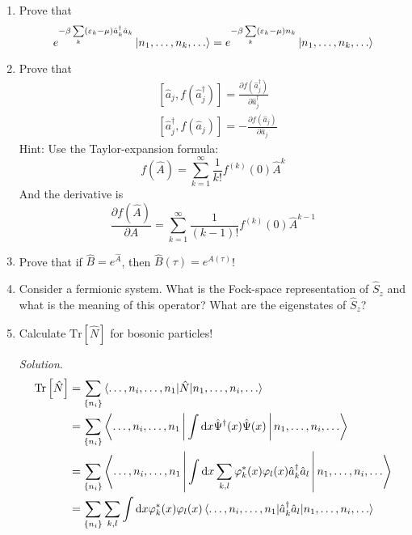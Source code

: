 \documentclass[11pt, a4paper]{article}
\newcommand{\dd}{\mathrm{d}}
\newcommand{\Tr}[1]{\mathrm{Tr}\left[#1\right]}
\begin{document}
\begin{enumerate}
    \item Prove that 
    \begin{equation*}
        e^{-\beta\sum\limits_k(\varepsilon_k - \mu)\hat a_k^{\dagger}\hat a_k}\ket{n_1, \dots, n_k, \dots}
        = e^{-\beta\sum\limits_k(\varepsilon_k - \mu)n_k}\ket{n_1, \dots, n_k, \dots}
    \end{equation*}
    \item Prove that 
    \begin{align*}
        &[\hat a_j, f(\hat a_j^{\dagger})] = \frac{\partial f(\hat a_j^{\dagger})}{\partial \hat a_j^{\dagger}}\\
        &[\hat a_j^{\dagger}, f(\hat a_j)] = -\frac{\partial f(\hat a_j)}{\partial \hat a_j}
    \end{align*}
    Hint: Use the Taylor-expansion formula:
    \begin{equation*}
        f(\hat A) = \sum\limits_{k=1}^{\infty} \frac{1}{k!}f^{(k)}(0)\hat A^k
    \end{equation*}
    And the derivative is 
    \begin{equation*}
        \frac{\partial f(\hat A)}{\partial A} = \sum\limits_{k=1}^{\infty} \frac{1}{(k-1)!}f^{(k)}(0)\hat A^{k-1}
    \end{equation*}
    \item Prove that if $\hat B = e^{\hat A}$, then $\hat B(\tau) = e^{\hat A(\tau)}$!
    \item Consider a fermionic system. What is the Fock-space representation of $\hat S_z$ and what is the meaning
    of this operator? What are the eigenstates of $\hat S_z$?
    \item Calculate $\Tr {\hat N}$ for bosonic particles!
    \par\textit{Solution}.
    \begin{align*}
        \Tr{\hat N} &= \sum\limits_{\{n_i\}}\braket{\dots,n_i,\dots,n_1 | \hat N |n_1, \dots, n_i, \dots} \\
        & = \sum\limits_{\{n_i\}}\Braket{\dots,n_i,\dots,n_1 | \int\dd x \hat\Psi^{\dagger}(x)\hat\Psi(x) |n_1, \dots, n_i, \dots} \\
        & = \sum\limits_{\{n_i\}}\Braket{\dots,n_i,\dots,n_1 | \int\dd x \sum\limits_{k,l}\varphi^*_k(x)\varphi_l(x)
        \hat a_k^{\dagger}\hat a_l |n_1, \dots, n_i, \dots} \\
        & = \sum\limits_{\{n_i\}}\sum\limits_{k,l}\int\dd x \varphi^*_k(x)\varphi_l(x) \braket{\dots,n_i,\dots,n_1 | \hat a_k^{\dagger}\hat a_l |n_1, \dots, n_i, \dots} \\

\end{align*}
\end{enumerate}
\end{document}
